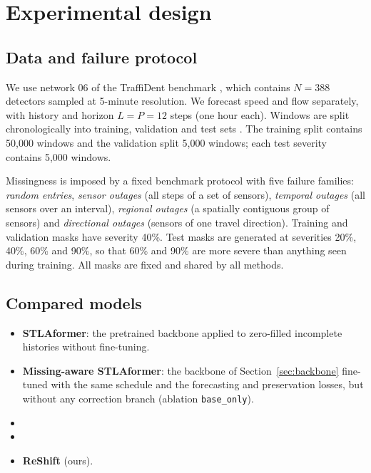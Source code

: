 \section{Experimental design}
\label{sec:experiments}

\subsection{Data and failure protocol}
\label{sec:data}
We use network 06 of the TraffiDent benchmark \citep{traffident}, which contains $N=388$ detectors sampled at 5-minute resolution.  We forecast speed and flow separately, with history and horizon $L=P=12$ steps (one hour each). Windows are split chronologically into training, validation and test sets . The training split contains 50{,}000 windows and the validation split 5{,}000 windows; each test severity contains 5{,}000 windows.

Missingness is imposed by a fixed benchmark protocol with five failure families: \emph{random entries}, \emph{sensor outages} (all steps of a set of sensors), \emph{temporal outages} (all sensors over an interval), \emph{regional outages} (a spatially contiguous group of sensors) and \emph{directional outages} (sensors of one travel direction). Training and validation masks have severity 40\%. Test masks are generated at severities 20\%, 40\%, 60\% and 90\%, so that 60\% and 90\% are more severe than anything seen during training. All masks are fixed and shared by all methods.

\subsection{Compared models}
\begin{itemize}[leftmargin=*]
\item \textbf{STLAformer}: the pretrained backbone applied to zero-filled incomplete histories without fine-tuning.
\item \textbf{Missing-aware STLAformer}: the backbone of Section~\ref{sec:backbone} fine-tuned with the same schedule and the forecasting and preservation losses, but without any correction branch (ablation \texttt{base\_only}).
\item {}
\item {}
\item \textbf{ReShift} (ours).
\end{itemize}

